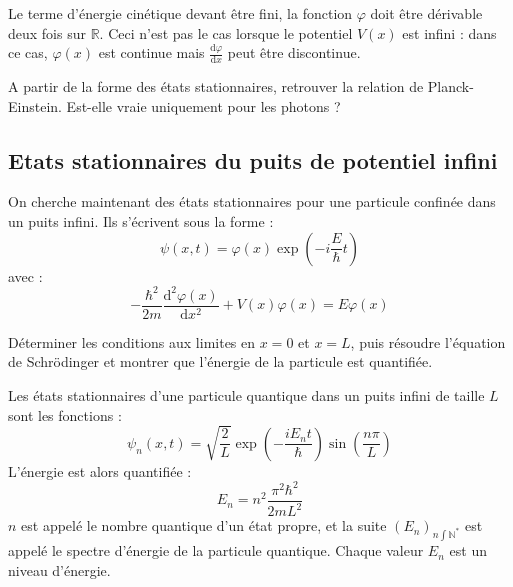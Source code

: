 \documentclass[11pt,fleqn]{book} %
\newcommand{\dd}{\mathrm{d}}
\begin{document}
\begin{remark}
	Le terme d'énergie cinétique devant être fini, la fonction $\varphi$ doit être dérivable deux fois sur $\mathbb{R}$. Ceci n'est pas le cas lorsque le potentiel $V(x)$ est infini : dans ce cas, $\varphi(x)$ est continue mais $\frac{\dd \varphi}{\dd x}$ peut être discontinue.
\end{remark}

\begin{capex}
	A partir de la forme des états stationnaires, retrouver la relation de Planck-Einstein. Est-elle vraie uniquement pour les photons ?
\end{capex}

\subsection{Etats stationnaires du puits de potentiel infini}

On cherche maintenant des états stationnaires pour une particule confinée dans un puits infini. Ils s'écrivent sous la forme :
\begin{equation}
        \psi(x,t) = \varphi(x) \exp\left(-i \frac{E}{\hbar} t\right)
\end{equation}
avec :
\begin{equation}
        - \frac{\hbar^2}{2m} \frac{\dd^2 \varphi(x)}{\dd x^2} + V(x) \varphi(x) = E \varphi(x)
\end{equation}

\begin{capex}
	Déterminer les conditions aux limites en $x=0$ et $x=L$, puis résoudre l'équation de Schrödinger et montrer que l'énergie de la particule est quantifiée.
\end{capex}

\begin{proposition}
	Les états stationnaires d'une particule quantique dans un puits infini de taille $L$ sont les fonctions :
	\begin{equation}
		\psi_n(x,t) = \sqrt{\frac{2}{L}} \exp \left(-\frac{iE_nt}{\hbar}\right) \sin \left(\frac{n\pi}{L}\right)
	\end{equation}
	L'énergie est alors quantifiée :
	\begin{equation}
		E_n = n^2 \frac{\pi^2 \hbar^2}{2 m L^2}
	\end{equation}
	$n$ est appelé le nombre quantique d'un état propre, et la suite $(E_n)_{n \int \mathbb{N}^\ast}$ est appelé le spectre d'énergie de la particule quantique. Chaque valeur $E_n$ est un niveau d'énergie.
\end{proposition}
\end{document}
